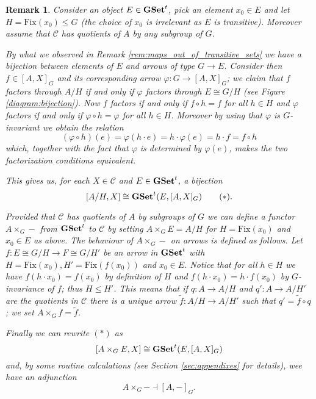 \documentclass[italian, 12pt, reqno]{article}
\theoremstyle{myteo}
\newtheorem{remark}[theorem]{Remark}
\numberwithin{equation}{section}
\newcommand{\cat}[1]{\mathscr{#1}}
\newcommand{\tgset}{\text{\textbf{GSet}}^t}
\newcommand{\fix}[1]{\text{Fix}(#1)}
\newcommand{\homs}[2]{[#1, #2]}
\newcommand{\fun}[3]{#1\colon#2\to #3}
\begin{document}
\begin{remark}
  \label{rem:adjoints}
  Consider an object \(E\in\tgset\), pick an element \(x_0\in E\) and let \(H = \fix{x_0}\leq G\) (the choice of \(x_0\) is irrelevant as \(E\) is transitive).
  Moreover assume that \(\cat{C}\) has quotients of \(A\) by any subgroup of \(G\).

  By what we observed in Remark \ref{rem:maps_out_of_transitive_sets} we have a bijection between elements of \(E\) and arrows of type \(G\to E\).
  Consider then \(f\in\homs{A}{X}_G\) and its corresponding arrow \(\fun{\varphi}{G}{\homs{A}{X}_G}\); we claim that \(f\) factors through \(A/H\) if and only if \(\varphi\) factors through \(E \cong G/H\) (see Figure \ref{diagram:bijection}).
  Now \(f\) factors if and only if \(f\circ h = f\) for all \(h\in H\) and \(\varphi\) factors if and only if \(\varphi \circ h = \varphi\) for all \(h \in H\).
  Moreover by using that \(\varphi\) is \(G\)-invariant we obtain the relation
  \[(\varphi \circ h)(e)= \varphi(h \cdot e) = h\cdot\varphi(e) = h\cdot f = f\circ h\]
  which, together with the fact that \(\varphi\) is determined by \(\varphi(e)\), makes the two factorization conditions equivalent.
  
  This gives us, for each \(X\in\cat{C}\) and \(E\in\tgset\), a bijection
  \[[A/H, X] \cong \tgset(E, [A, X]_G)\tag{\(*\)}.\]


  Provided that \(\cat{C}\) has quotients of \(A\) by subgroups of \(G\) we can define a functor \(A\times_G -\) from \(\tgset\) to \(\cat{C}\) by setting \(A\times_G E = A/H\) for \(H=\text{Fix}(x_0)\) and \(x_0\in E\) as above.
  The behaviour of \(A\times_G-\) on arrows is defined as follows.
  Let \(\fun{f}{E\cong G/H}{F\cong G/H'}\) be an arrow in \(\tgset\) with \(H=\text{Fix}(x_0), H'=\text{Fix}(f(x_0))\) and \(x_0\in E\).
  Notice that for all \(h\in H\) we have \(f(h\cdot x_0) = f(x_0)\) by definition of \(H\) and \(f(h\cdot x_0) = h\cdot f(x_0)\) by \(G\)-invariance of \(f\); thus \(H\leq H'\).
  This means that if \(\fun{q}{A}{A/H}\) and \(\fun{q'}{A}{A/H'}\) are the quotients in \(\cat{C}\) there is a unique arrow \(\fun{\tilde{f}}{A/H}{A/H'}\) such that \(q' = \tilde{f}\circ q\); we set \(A\times_G f = \tilde{f}\).

  Finally we can rewrite \((*)\) as
  \[[A \times_G E, X] \cong \tgset(E, [A, X]_G)\]
  and, by some routine calculations (see Section \ref{sec:appendixes} for details), wee have an adjunction
  \[A\times_G - \dashv \homs{A}{-}_G.\]
\end{remark}
\end{document}
